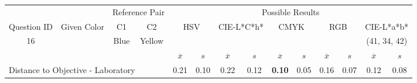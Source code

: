 \begin{table}[H]
  \resizebox{\textwidth}{!} {
  \begin{tabular}{lccccccccccccc}
    \hline
    \multicolumn{1}{c}{}                              &                                      & \multicolumn{2}{c}{Reference Pair}                   & \multicolumn{10}{c}{Possible Results}                                                                                                                                                                                                                                                                                        \\ \cline{3-14}
    \multicolumn{1}{c}{\multirow{-2}{*}{Question ID}} & \multirow{-2}{*}{Given Color}        & C1                       & C2                         & \multicolumn{2}{c}{HSV}                                        & \multicolumn{2}{c}{CIE-L*C*h*}                                 & \multicolumn{2}{c}{CMYK}                                       & \multicolumn{2}{c}{RGB}                                        & \multicolumn{2}{c}{CIE-L*a*b*}                                 \\ \hline
    \multicolumn{1}{c}{16}                             & \cellcolor[HTML]{FF007F}{\color[HTML]{FFFFFF}(45, 23, 22)} & \multicolumn{1}{c|}{Blue} & \multicolumn{1}{c|}{Yellow}  & \multicolumn{2}{c|}{\cellcolor[HTML]{FF007F}{\color[HTML]{FFFFFF}(45, 23, 22)}}      & \multicolumn{2}{c|}{\cellcolor[HTML]{FF0050}{\color[HTML]{FFFFFF}(43, 22, 10)}}       & \multicolumn{2}{c|}{\cellcolor[HTML]{808080}{\color[HTML]{FFFFFF}(21, 22, 24)}}       & \multicolumn{2}{c|}{\cellcolor[HTML]{808080}{\color[HTML]{FFFFFF}(21, 22, 24)}}       & \multicolumn{2}{c|}{\cellcolor[HTML]{CA8AAA}(41, 34, 42)}       \\ \hline
                                                      & \multicolumn{1}{l}{}                 & \multicolumn{1}{l}{}     & \multicolumn{1}{l}{}       & \multicolumn{1}{c}{$\overline{x}$} & \multicolumn{1}{c}{$s$} & \multicolumn{1}{c}{$\overline{x}$} & \multicolumn{1}{c}{$s$} & \multicolumn{1}{c}{$\overline{x}$} & \multicolumn{1}{c}{$s$} & \multicolumn{1}{c}{$\overline{x}$} & \multicolumn{1}{c}{$s$} & \multicolumn{1}{c}{$\overline{x}$} & \multicolumn{1}{c}{$s$} \\ \hline
    \multicolumn{4}{l}{Distance to Objective - Laboratory}                                                                                           & \multicolumn{1}{|c}{0.21}       & \multicolumn{1}{c|}{0.10}    & \multicolumn{1}{|c}{0.22}       & \multicolumn{1}{c|}{0.12}    & \multicolumn{1}{|c}{\textbf{0.10}}       & \multicolumn{1}{c|}{0.05}    & \multicolumn{1}{|c}{0.16}       & \multicolumn{1}{c|}{0.07}    & \multicolumn{1}{|c}{0.12}       & \multicolumn{1}{c|}{0.08}    \\

\end{tabular}}
\end{table}
